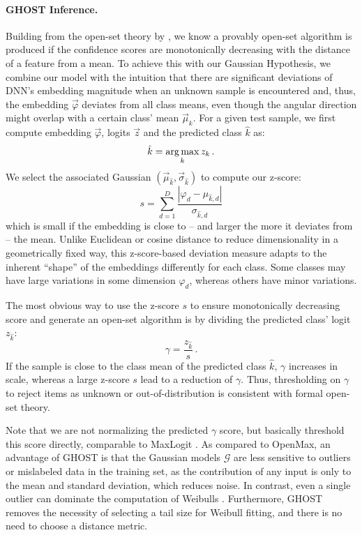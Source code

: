\paragraph{GHOST Inference.} Building from the open-set theory by \citet{bendale2016openmax}, we know a provably open-set algorithm is produced if the confidence scores are monotonically decreasing with the distance of a feature from a mean.
To achieve this with our Gaussian Hypothesis, we combine our model with the intuition that there are significant deviations of DNN's embedding magnitude when an unknown sample is encountered \cite{dhamija2018reducing,cruz2024oosa} and, thus, the embedding $\vec\varphi$ deviates from all class means, even though the angular direction might overlap with a certain class' mean $\vec\mu_k$.
For a given test sample, we first compute embedding $\vec\varphi$, logits $\vec z$ and the predicted class $\hat k$ as:
\begin{equation}
    \label{eq:max-class}
    \hat k = \operatorname*{arg\,max}_k z_k\,.
\end{equation}
We select the associated Gaussian $(\vec\mu_{\hat k}, \vec\sigma_{\hat k})$ to compute our z-score:
\begin{equation}
    s = \sum_{d=1}^D \frac{|\varphi_d - \mu_{\hat k, d}|}{\sigma_{\hat k, d}}
\end{equation}
which is small if the embedding is close to -- and larger the more it deviates from -- the mean.
Unlike Euclidean or cosine distance to reduce dimensionality in a geometrically fixed way, this z-score-based deviation measure adapts to the inherent ``shape'' of the embeddings differently for each class.
Some classes may have large variations in some dimension $\varphi_d$, whereas others have minor variations.  

The most obvious way to use the z-score $s$ to ensure monotonically decreasing score and generate an open-set algorithm is by dividing the predicted class' logit $z_{\hat k}$:
\begin{equation}
  \gamma = \frac{z_{\hat k}}{s}\,.
\end{equation}
If the sample is close to the class mean of the predicted class $\hat k$, $\gamma$ increases in scale, whereas a large z-score $s$ lead to a reduction of $\gamma$.
Thus, thresholding on $\gamma$ to reject items as unknown or out-of-distribution is consistent with formal open-set theory.

Note that we are not normalizing the predicted $\gamma$ score, but basically threshold this score directly, comparable to MaxLogit \cite{hendrycks2022scaling}.
As compared to OpenMax, an advantage of GHOST is that the Gaussian models $\mathcal G$ are less sensitive to outliers or mislabeled data in the training set, as the contribution of any input is only to the mean and standard deviation, which reduces noise.  
In contrast, even a single outlier can dominate the computation of Weibulls  \cite{scheirer2012toward,scheirer2014probability,bendale2016openmax,rudd2017evm}. 
Furthermore, GHOST removes the necessity of selecting a tail size for Weibull fitting, and there is no need to choose a distance metric.




